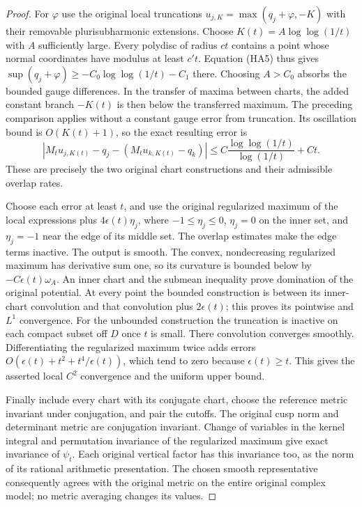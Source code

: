 \begin{proof}
For $\varphi$ use the original local truncations
$u_{j,K}=\max(q_j+\varphi,-K)$ with their removable
plurisubharmonic extensions.  Choose
$K(t)=A\log\log(1/t)$ with $A$ sufficiently large.
Every polydisc of radius $ct$ contains a point whose normal
coordinates have modulus at least $c't$.  Equation (HA5) thus gives
$\sup(q_j+\varphi)\ge-C_0\log\log(1/t)-C_1$ there.
Choosing $A>C_0$ absorbs the bounded gauge differences.  In the
transfer of maxima between charts, the added constant branch
$-K(t)$ is then below the transferred maximum.  The preceding
comparison applies without a constant gauge error from truncation.
Its oscillation bound is $O(K(t)+1)$, so the exact resulting error is
\[
 |M_tu_{j,K(t)}-q_j-(M_tu_{k,K(t)}-q_k)|
         \le C\frac{\log\log(1/t)}{\log(1/t)}+Ct.
 \tag{HA14}
\]
These are precisely the two original chart constructions and
their admissible overlap rates\cite{height-assembly-regularization-source}.

Choose each error at least $t$, and use the original regularized
maximum of the local expressions plus $4\epsilon(t)\eta_j$,
where $-1\le\eta_j\le0$, $\eta_j=0$ on the inner set, and
$\eta_j=-1$ near the edge of its middle set.  The overlap estimates
make the edge terms inactive.  The output is smooth.  The convex,
nondecreasing regularized maximum has derivative sum one, so its
curvature is bounded below by $-C\epsilon(t)\omega_A$.
An inner chart and the submean inequality prove domination of the
original potential.  At every point the bounded construction is
between its inner-chart convolution and that convolution plus
$2\epsilon(t)$; this proves its pointwise and $L^1$ convergence.
For the unbounded construction the truncation is inactive on each
compact subset off $D$ once $t$ is small.  There convolution
converges smoothly.  Differentiating the regularized maximum
twice adds errors $O(\epsilon(t)+t^2+t^4/\epsilon(t))$, which
tend to zero because $\epsilon(t)\ge t$.  This gives the asserted
local $C^2$ convergence and the uniform upper bound.

Finally include every chart with its conjugate chart, choose the
reference metric invariant under conjugation, and pair the cutoffs.
The original cusp norm and determinant metric are conjugation
invariant.  Change of variables in the kernel integral and
permutation invariance of the regularized maximum give exact
invariance of $\psi_t$.  Each original vertical factor has this
invariance too, as the norm of its rational arithmetic presentation.
The chosen smooth representative consequently agrees with the
original metric on the entire original complex model; no metric
averaging changes its values.
\end{proof}

